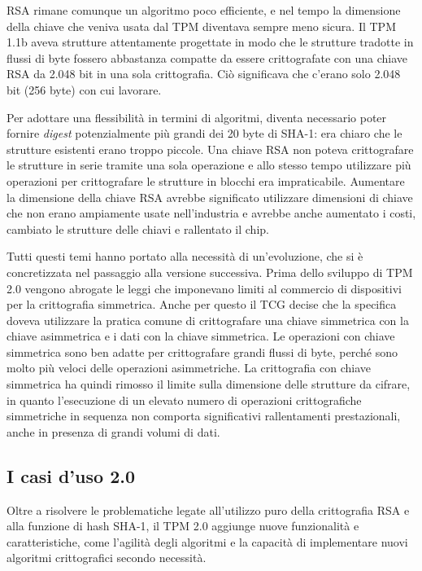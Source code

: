 RSA rimane comunque un algoritmo poco efficiente, e nel tempo la dimensione della chiave che veniva usata dal TPM diventava sempre meno sicura. Il TPM 1.1b aveva strutture attentamente progettate in modo che le strutture tradotte in flussi di byte fossero abbastanza compatte da essere crittografate con una chiave RSA da 2.048 bit in una sola crittografia. Ciò significava che c'erano solo 2.048 bit (256 byte) con cui lavorare.

Per adottare una flessibilità in termini di algoritmi, diventa necessario poter fornire \textit{digest} potenzialmente più grandi dei 20 byte di SHA-1: era chiaro che le strutture esistenti erano troppo piccole. Una chiave RSA non poteva crittografare le strutture in serie tramite una sola operazione e allo stesso tempo utilizzare più operazioni per crittografare le strutture in blocchi era impraticabile. Aumentare la dimensione della chiave RSA avrebbe significato utilizzare dimensioni di chiave che non erano ampiamente usate nell'industria e avrebbe anche aumentato i costi, cambiato le strutture delle chiavi e rallentato il chip.

Tutti questi temi hanno portato alla necessità di un'evoluzione, che si è concretizzata nel passaggio alla versione successiva. Prima dello sviluppo di TPM 2.0 vengono abrogate le leggi che imponevano limiti al commercio di dispositivi per la crittografia simmetrica. Anche per questo il TCG decise che la specifica doveva utilizzare la pratica comune di crittografare una chiave simmetrica con la chiave asimmetrica e i dati con la chiave simmetrica. Le operazioni con chiave simmetrica sono ben adatte per crittografare grandi flussi di byte, perché sono molto più veloci delle operazioni asimmetriche. 
La crittografia con chiave simmetrica ha quindi rimosso il limite sulla dimensione delle strutture da cifrare, in quanto l’esecuzione di un elevato numero di operazioni crittografiche simmetriche in sequenza non comporta significativi rallentamenti prestazionali, anche in presenza di grandi volumi di dati.

\subsection{I casi d’uso 2.0}
Oltre a risolvere le problematiche legate all’utilizzo puro della crittografia RSA e alla funzione di hash SHA-1, il TPM 2.0 aggiunge nuove funzionalità e caratteristiche, come l'agilità degli algoritmi e la capacità di implementare nuovi algoritmi crittografici secondo necessità.

